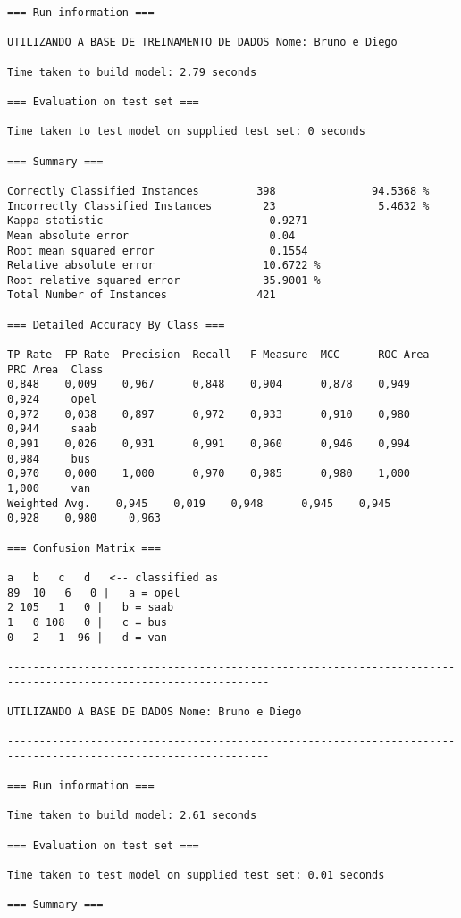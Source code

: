 \documentclass[
	article,			%
	11pt,				%
	oneside,			%
	a4paper,			%
	english,			%
	brazil,				%
	sumario=tradicional
	]{abntex2}
\begin{document}
\begin{lstlisting}
=== Run information ===

UTILIZANDO A BASE DE TREINAMENTO DE DADOS Nome: Bruno e Diego

Time taken to build model: 2.79 seconds

=== Evaluation on test set ===

Time taken to test model on supplied test set: 0 seconds

=== Summary ===

Correctly Classified Instances         398               94.5368 %
Incorrectly Classified Instances        23                5.4632 %
Kappa statistic                          0.9271
Mean absolute error                      0.04  
Root mean squared error                  0.1554
Relative absolute error                 10.6722 %
Root relative squared error             35.9001 %
Total Number of Instances              421     

=== Detailed Accuracy By Class ===

TP Rate  FP Rate  Precision  Recall   F-Measure  MCC      ROC Area  PRC Area  Class
0,848    0,009    0,967      0,848    0,904      0,878    0,949     0,924     opel
0,972    0,038    0,897      0,972    0,933      0,910    0,980     0,944     saab
0,991    0,026    0,931      0,991    0,960      0,946    0,994     0,984     bus
0,970    0,000    1,000      0,970    0,985      0,980    1,000     1,000     van
Weighted Avg.    0,945    0,019    0,948      0,945    0,945      0,928    0,980     0,963     

=== Confusion Matrix ===

a   b   c   d   <-- classified as
89  10   6   0 |   a = opel
2 105   1   0 |   b = saab
1   0 108   0 |   c = bus
0   2   1  96 |   d = van

---------------------------------------------------------------------------------------------------------------

UTILIZANDO A BASE DE DADOS Nome: Bruno e Diego

---------------------------------------------------------------------------------------------------------------

=== Run information ===

Time taken to build model: 2.61 seconds

=== Evaluation on test set ===

Time taken to test model on supplied test set: 0.01 seconds

=== Summary ===


\end{lstlisting}
\end{document}
